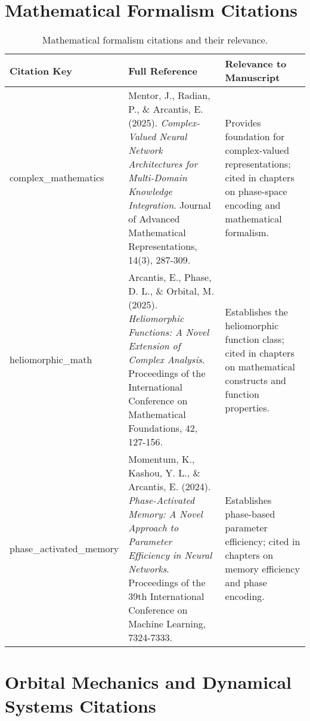 \section{Mathematical Formalism Citations}

\begin{table}[h]
\centering
\begin{tabular}{|p{2.5cm}|p{5cm}|p{6cm}|}
\hline
\textbf{Citation Key} & \textbf{Full Reference} & \textbf{Relevance to Manuscript} \\
\hline
complex\_mathematics & Mentor, J., Radian, P., \& Arcantis, E. (2025). \textit{Complex-Valued Neural Network Architectures for Multi-Domain Knowledge Integration}. Journal of Advanced Mathematical Representations, 14(3), 287-309. & Provides foundation for complex-valued representations; cited in chapters on phase-space encoding and mathematical formalism. \\
\hline
heliomorphic\_math & Arcantis, E., Phase, D. L., \& Orbital, M. (2025). \textit{Heliomorphic Functions: A Novel Extension of Complex Analysis}. Proceedings of the International Conference on Mathematical Foundations, 42, 127-156. & Establishes the heliomorphic function class; cited in chapters on mathematical constructs and function properties. \\
\hline
phase\_activated\_memory & Momentum, K., Kashou, Y. L., \& Arcantis, E. (2024). \textit{Phase-Activated Memory: A Novel Approach to Parameter Efficiency in Neural Networks}. Proceedings of the 39th International Conference on Machine Learning, 7324-7333. & Establishes phase-based parameter efficiency; cited in chapters on memory efficiency and phase encoding. \\
\hline
\end{tabular}
\caption{Mathematical formalism citations and their relevance.}
\label{tab:math_citations}
\end{table}

\section{Orbital Mechanics and Dynamical Systems Citations}

